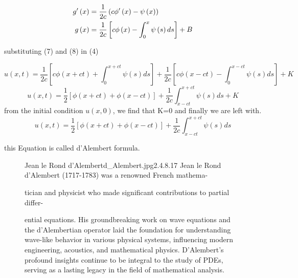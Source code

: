 \documentclass[]{article}
\begin{document}
\begin{align}
g'\left(x\right) &= \frac{1}{2c}\left(c\phi'\left(x\right)-\psi\left(x\right)\right)\notag
\\ 
g\left(x\right) &= \frac{1}{2c}\left[c\phi\left(x\right)-\int_0^x \psi\left(s\right)ds\right]+B
\end{align}

substituting (7) and (8) in (4)

\[
    u\left(x,t\right) = \frac{1}{2c}\left[c\phi\left(x+ct\right)+\int_{0}^{x+ct} \psi\left(s\right)ds\right]+\frac{1}{2c}\left[c\phi\left(x-ct\right)-\int_{0}^{x-ct} \psi\left(s\right)ds\right]+K    
\]
\[
    u\left(x,t\right) = \frac{1}{2}\left[\phi\left(x+ct\right)+\phi\left(x-ct\right)\right]+\frac{1}{2c}\int_{x-ct}^{x+ct} \psi\left(s\right)ds + K    
\]
from the initial condition $u(x,0)$, we find that K=0 and finally we are left with.
\[
    u\left(x,t\right) = \frac{1}{2}\left[\phi\left(x+ct\right)+\phi\left(x-ct\right)\right]+\frac{1}{2c}\int_{x-ct}^{x+ct} \psi\left(s\right)ds    
\]

this Equation is called d'Alembert formula.
\begin{figure}[b]
    \begin{enrichment}{Jean le Rond d'Alembert}{d_Alembert.jpg}{2.4}{.8}{.17}
        Jean le Rond d'Alembert (1717-1783) was a renowned French mathema-
        
        tician and physicist who made significant contributions to partial differ-
        
        ential equations. His groundbreaking work on wave equations and the d'Alembertian operator laid the foundation for understanding wave-like behavior in various physical systems, influencing modern engineering, acoustics, and mathematical physics.
        D'Alembert's profound insights continue to be integral to the study of PDEs, serving as a lasting legacy in the field of mathematical analysis.
    \end{enrichment}    
\end{figure}

\setcounter{equation}{0}
\end{document}
